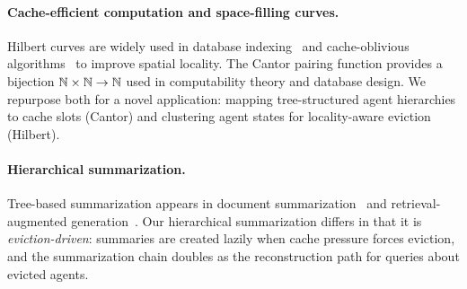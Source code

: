 \paragraph{Cache-efficient computation and space-filling curves.}
Hilbert curves are widely used in database
indexing~\citep{lawder2000hilbert} and cache-oblivious
algorithms~\citep{frigo1999cache} to improve spatial
locality.  The Cantor pairing function provides a bijection
$\mathbb{N} \times \mathbb{N} \to \mathbb{N}$ used in computability theory and database
design.  We repurpose both for a novel application: mapping
tree-structured agent hierarchies to cache slots (Cantor) and
clustering agent states for locality-aware eviction (Hilbert).

\paragraph{Hierarchical summarization.}
Tree-based summarization appears in document
summarization~\citep{wu2021recursively} and retrieval-augmented
generation~\citep{raptor2024}.  Our hierarchical summarization differs
in that it is \emph{eviction-driven}: summaries are created lazily
when cache pressure forces eviction, and the summarization chain
doubles as the reconstruction path for queries about evicted agents.
